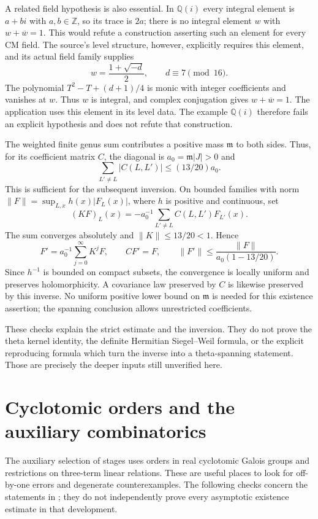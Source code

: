 \documentclass[11pt,a4paper]{article}
\theoremstyle{remark}
\newcommand{\Z}{\mathbb Z}
\newcommand{\Q}{\mathbb Q}
\newcommand{\src}[1]{\cite{#1}}
\begin{document}
A related field hypothesis is also essential. In $\Q(i)$ every integral element is $a+bi$ with $a,b\in\Z$, so its trace is $2a$; there is no integral element $w$ with $w+\overline w=1$. This would refute a construction asserting such an element for every CM field. The source's level structure, however, explicitly requires this element, and its actual field family supplies
\[
 w=\frac{1+\sqrt{-d}}2,\qquad d\equiv7\pmod{16}.
\]
The polynomial $T^2-T+(d+1)/4$ is monic with integer coefficients and vanishes at $w$. Thus $w$ is integral, and complex conjugation gives $w+\overline w=1$. The application uses this element in its level data. The example $\Q(i)$ therefore fails an explicit hypothesis and does not refute that construction. \src{S-theta-count}

The weighted finite genus sum contributes a positive mass $\mathfrak m$ to both sides. Thus, for its coefficient matrix $C$, the diagonal is
$a_0=\mathfrak m|J|>0$ and
\[
 \sum_{L'\ne L}|C(L,L')|\le(13/20)a_0.
\]
This is sufficient for the subsequent inversion. On bounded families with norm
$\|F\|=\sup_{L,x}h(x)|F_L(x)|$, where $h$ is positive and continuous, set
\[
 (KF)_L(x)=-a_0^{-1}\sum_{L'\ne L}C(L,L')F_{L'}(x).
\]
The sum converges absolutely and $\|K\|\le13/20<1$. Hence
\[
 F'=a_0^{-1}\sum_{j=0}^{\infty}K^jF,\qquad
 CF'=F,\qquad
 \|F'\|\le\frac{\|F\|}{a_0(1-13/20)}.
\]
Since $h^{-1}$ is bounded on compact subsets, the convergence is locally uniform and preserves holomorphicity. A covariance law preserved by $C$ is likewise preserved by this inverse. No uniform positive lower bound on $\mathfrak m$ is needed for this existence assertion; the spanning conclusion allows unrestricted coefficients.

These checks explain the strict estimate and the inversion. They do not prove the theta kernel identity, the definite Hermitian Siegel--Weil formula, or the explicit reproducing formula which turn the inverse into a theta-spanning statement. Those are precisely the deeper inputs still unverified here.

\section{Cyclotomic orders and the auxiliary combinatorics}\label{sec:behrend}
The auxiliary selection of stages uses orders in real cyclotomic Galois groups and restrictions on three-term linear relations. These are useful places to look for off-by-one errors and degenerate counterexamples. The following checks concern the statements in ; they do not independently prove every asymptotic existence estimate in that development. \src{S-behrend}
\end{document}
